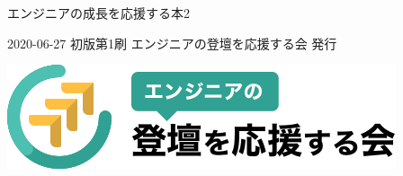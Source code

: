 \clearpage{\thispagestyle{empty}}
\begin{center}

\vspace{120pt}

\begin{sffamily}
\Large
エンジニアの成長を応援する本2
\normalsize
\end{sffamily}
\vspace{320pt}

\begin{sffamily}
2020-06-27
\hspace{5pt}
初版第1刷
\hspace{5pt}
エンジニアの登壇を応援する会
\hspace{5pt}
発行
\end{sffamily}

\includegraphics[width=0.3\linewidth]{images/engineers_lt.png}

\end{center}
